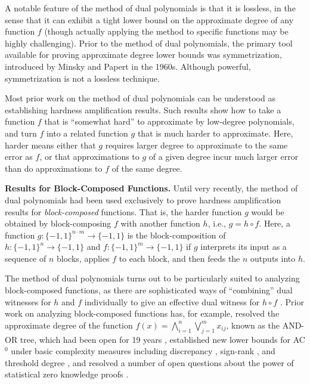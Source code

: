 \documentclass[11pt, letterpaper, fleqn]{article}
\theoremstyle{plain}
\newcommand{\bits}{\{-1,1\}}
\begin{document}
A notable feature of the method of dual polynomials is that it is lossless,
in the sense that it can exhibit a tight lower bound on the approximate degree of 
any function $f$ (though actually applying the method to specific functions may be highly challenging). Prior to the method of dual polynomials, the primary tool available for proving approximate degree lower bounds was symmetrization, introduced by Minsky and Papert \cite{mp} in the 1960s. Although powerful, symmetrization is not a lossless technique.

Most prior work on 
the method of dual polynomials 
can be understood as establishing hardness amplification results. 
Such results show how to take a function $f$ that is ``somewhat hard'' to approximate
by low-degree polynomials, and turn $f$ into a related function $g$ that is much harder to approximate.
Here, harder means either that $g$ requires larger degree
to approximate to the same error as $f$, or that approximations to $g$ of a given degree incur 
much larger error than do approximations to $f$ of the same degree. 

\vspace{-.4mm}
\medskip \noindent \textbf{Results for Block-Composed Functions.} 
Until very recently, the method of dual polynomials had been used exclusively to prove hardness amplification results for \emph{block-composed} functions. 
That is, the harder function $g$ would be obtained by block-composing $f$ with another 
function $h$, i.e., $g=h \circ f$. 
Here, a function
$g \colon \bits^{n \cdot m} \to \bits$ is the block-composition of $h \colon \bits^n \to \bits$ and $f \colon \bits^m \to \bits$ 
if $g$ interprets its input as a sequence of $n$ blocks, 
applies $f$
to each block, and then feeds the $n$ outputs into $h$.

The method of dual polynomials turns out to be particularly suited to analyzing block-composed functions, as there 
are sophisticated ways of ``combining'' dual witnesses for $h$ and $f$ individually to give 
an effective dual witness for $h \circ f$ \cite{sherstovhalfspaces1, shizhu, sherstovandor, bt13, bt14, thaler, sherstov14, sherstov15, bchtv}.
Prior work on analyzing block-composed functions has, for example,
resolved the approximate degree of the function $f(x) = \bigwedge_{i=1}^n \bigvee_{j=1}^m x_{ij}$, known as the AND-OR tree, which had been open for 19 years
\cite{bt13, sherstovandor}, 
established new lower bounds for AC$^0$ under basic complexity measures including
discrepancy \cite{bt14, thaler, sherstov14, sherstov15}, sign-rank \cite{bt16}, and threshold degree \cite{sherstov15, sherstov14}, and
resolved a number of open questions about the power of statistical zero knowledge proofs \cite{bchtv}.
\end{document}
